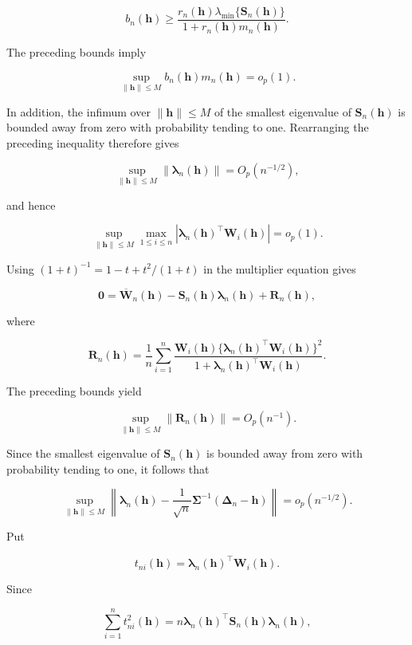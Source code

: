 \documentclass[11pt]{article}
\theoremstyle{remark}
\begin{document}
$$ b_n(\boldsymbol{h})\geq\frac{r_n(\boldsymbol{h})\lambda_{\min}\{\boldsymbol{S}_n(\boldsymbol{h})\}}{1+r_n(\boldsymbol{h})m_n(\boldsymbol{h})}. $$

The preceding bounds imply

$$ \sup_{\|\boldsymbol{h}\|\leq M}b_n(\boldsymbol{h})m_n(\boldsymbol{h})=o_p(1). $$

In addition, the infimum over $\|\boldsymbol{h}\|\leq M$ of the smallest eigenvalue of $\boldsymbol{S}_n(\boldsymbol{h})$ is bounded away from zero with probability tending to one. Rearranging the preceding inequality therefore gives

$$ \sup_{\|\boldsymbol{h}\|\leq M}\|\boldsymbol{\lambda}_n(\boldsymbol{h})\|=O_p(n^{-1/2}), $$

and hence

$$ \sup_{\|\boldsymbol{h}\|\leq M}\max_{1\leq i\leq n}\left|\boldsymbol{\lambda}_n(\boldsymbol{h})^\top\boldsymbol{W}_i(\boldsymbol{h})\right|=o_p(1). $$

Using $(1+t)^{-1}=1-t+t^2/(1+t)$ in the multiplier equation gives

$$ \boldsymbol{0}=\overline{\boldsymbol{W}}_n(\boldsymbol{h})-\boldsymbol{S}_n(\boldsymbol{h})\boldsymbol{\lambda}_n(\boldsymbol{h})+\boldsymbol{R}_n(\boldsymbol{h}), $$

where

$$ \boldsymbol{R}_n(\boldsymbol{h})=\frac{1}{n}\sum_{i=1}^n\frac{\boldsymbol{W}_i(\boldsymbol{h})\{\boldsymbol{\lambda}_n(\boldsymbol{h})^\top\boldsymbol{W}_i(\boldsymbol{h})\}^2}{1+\boldsymbol{\lambda}_n(\boldsymbol{h})^\top\boldsymbol{W}_i(\boldsymbol{h})}. $$

The preceding bounds yield

$$ \sup_{\|\boldsymbol{h}\|\leq M}\|\boldsymbol{R}_n(\boldsymbol{h})\|=O_p(n^{-1}). $$

Since the smallest eigenvalue of $\boldsymbol{S}_n(\boldsymbol{h})$ is bounded away from zero with probability tending to one, it follows that

$$ \sup_{\|\boldsymbol{h}\|\leq M}\left\|\boldsymbol{\lambda}_n(\boldsymbol{h})-\frac{1}{\sqrt{n}}\boldsymbol{\Sigma}^{-1}(\boldsymbol{\Delta}_n-\boldsymbol{h})\right\|=o_p(n^{-1/2}). $$

Put

$$ t_{ni}(\boldsymbol{h})=\boldsymbol{\lambda}_n(\boldsymbol{h})^\top\boldsymbol{W}_i(\boldsymbol{h}). $$

Since

$$ \sum_{i=1}^n t_{ni}^2(\boldsymbol{h})=n\boldsymbol{\lambda}_n(\boldsymbol{h})^\top\boldsymbol{S}_n(\boldsymbol{h})\boldsymbol{\lambda}_n(\boldsymbol{h}), $$
\end{document}
